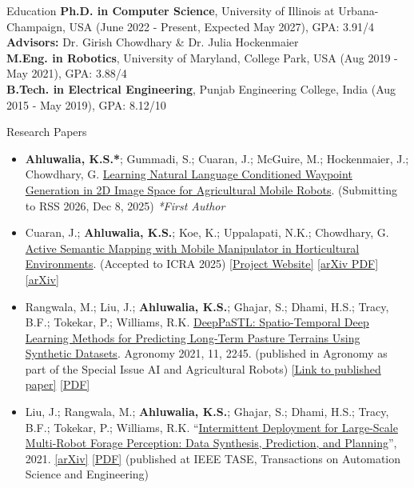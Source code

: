 \documentclass{resume} %
\begin{document}
\begin{rSection}{Education}
    \textbf{Ph.D. in Computer Science}, University of Illinois at Urbana-Champaign, USA (June 2022 - Present, Expected May 2027), GPA: 3.91/4 \\
    \textbf{Advisors:} Dr. Girish Chowdhary \& Dr. Julia Hockenmaier \\
    \textbf{M.Eng. in Robotics}, University of Maryland, College Park, USA (Aug 2019 - May 2021), GPA: 3.88/4 \\
    \textbf{B.Tech. in Electrical Engineering}, Punjab Engineering College, India (Aug 2015 - May 2019), GPA: 8.12/10
\end{rSection}

\begin{rSection}{Research Papers}
    \begin{itemize}[noitemsep]
        \item \textbf{Ahluwalia, K.S.*}; Gummadi, S.; Cuaran, J.; McGuire, M.; Hockenmaier, J.; Chowdhary, G. \ul{Learning Natural Language Conditioned Waypoint Generation in 2D Image Space for Agricultural Mobile Robots}. (Submitting to RSS 2026, Dec 8, 2025) \textit{*First Author}
        \item Cuaran, J.; \textbf{Ahluwalia, K.S.}; Koe, K.; Uppalapati, N.K.; Chowdhary, G. \ul{Active Semantic Mapping with Mobile Manipulator in Horticultural Environments}. (Accepted to ICRA 2025) 
        \href{https://kendallkoe.com/ICRA_UIE/ } {[Project Website]} 
        \href{https://arxiv.org/pdf/2501.19395 } {[arXiv PDF]} \href{https://arxiv.org/abs/2501.19395 } {[arXiv]} 
        \item Rangwala, M.; Liu, J.; \textbf{Ahluwalia, K.S.}; Ghajar, S.; Dhami, H.S.; Tracy, B.F.; Tokekar, P.; Williams, R.K. \ul{DeepPaSTL: Spatio-Temporal Deep Learning Methods for Predicting Long-Term Pasture Terrains Using Synthetic Datasets}. Agronomy 2021, 11, 2245. (published in Agronomy as part of the Special Issue AI and Agricultural Robots) \href{https://doi.org/10.3390/agronomy11112245} {[Link to published paper]} \href{https://drive.google.com/file/d/1chm-GREu_F6giMr692lVPtRuJYVM_UcB/view?usp=sharing}{[PDF]}
        \item Liu, J.; Rangwala, M.; \textbf{Ahluwalia, K.S.}; Ghajar, S.; Dhami, H.S.; Tracy, B.F.; Tokekar, P.; Williams, R.K.  ``\ul{Intermittent Deployment for Large-Scale Multi-Robot Forage Perception: Data Synthesis, Prediction, and Planning}'', 2021. \href{https://arxiv.org/abs/2112.09203}{[arXiv]} \href{https://arxiv.org/pdf/2112.09203.pdf}{[PDF]}
        (published at IEEE TASE, Transactions on Automation Science and Engineering)
    \end{itemize}
\end{rSection}
\end{document}
